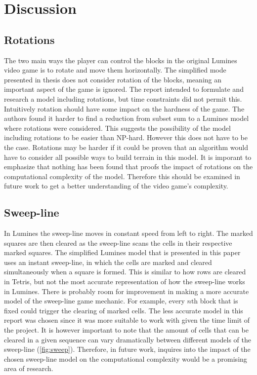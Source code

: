 \section{Discussion}
\label{discussion}

\subsection{Rotations}

The two main ways the player can control the blocks in the original Lumines video game is to rotate and move them horizontally. The simplified mode presented in thesis does not consider rotation of the blocks, meaning an important aspect of the game is ignored. The report intended to formulate and research a model including rotations, but time constraints did not permit this. Intuitively rotation should have some impact on the hardness of the game. The authors found it harder to find a reduction from subset sum to a Lumines model where rotations were considered. This suggests the possibility of the model including rotations to be easier than NP-hard. However this does not have to be the case. Rotations may be harder if it could be proven that an algorithm would have to consider all possible ways to build terrain in this model. It is imporant to emphasize that nothing has been found that proofs the impact of rotations on the computational complexity of the model. Therefore this should be examined in future work to get a better understanding of the video game's complexity.

\subsection{Sweep-line}

In Lumines the sweep-line moves in constant speed from left to right. The marked squares are then cleared as the sweep-line scans the cells in their respective marked squares. The simplified Lumines model that is presented in this paper uses an instant sweep-line, in which the cells are marked and cleared simultaneously when a square is formed. This is similar to how rows are cleared in Tetris, but not the most accurate representation of how the sweep-line works in Lumines. There is probably room for improvement in making a more accurate model of the sweep-line game mechanic. For example, every $n\text{th}$ block that is fixed could trigger the clearing of marked cells. The less accurate model in this report was chosen since it was more suitable to work with given the time limit of the project. It is however important to note that the amount of cells that can be cleared in a given sequence can vary dramatically between different models of the sweep-line (\autoref{fig:sweep}). Therefore, in future work, inquires into the impact of the chosen sweep-line model on the computational complexity would be a promising area of research.

